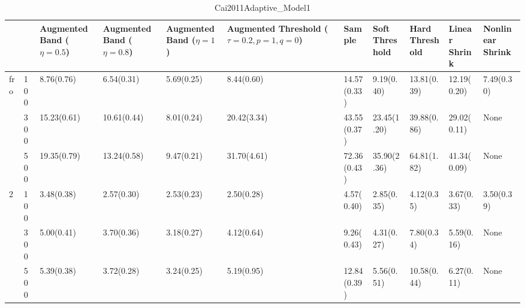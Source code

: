 \begin{table}[htbp]
\centering
\caption{Cai2011Adaptive_Model1}
\label{my label}
\begin{tabular}{ll|p{2cm}p{2cm}p{2cm}p{2cm}p{2cm}p{2cm}p{2cm}p{2cm}p{2cm}}
\toprule
  &     & Augmented Band ($\eta=0.5$) & Augmented Band ($\eta=0.8$) & Augmented Band ($\eta=1$) & Augmented Threshold ($\tau=0.2, p=1, q=0$) &       Sample & Soft Threshold & Hard Threshold & Linear Shrink & Nonlinear Shrink \\
\midrule
fro & 100 &                  8.76(0.76) &                  6.54(0.31) &                5.69(0.25) &                                 8.44(0.60) &  14.57(0.33) &     9.19(0.40) &    13.81(0.39) &   12.19(0.20) &       7.49(0.30) \\
  & 300 &                 15.23(0.61) &                 10.61(0.44) &                8.01(0.24) &                                20.42(3.34) &  43.55(0.37) &    23.45(1.20) &    39.88(0.86) &   29.02(0.11) &             None \\
  & 500 &                 19.35(0.79) &                 13.24(0.58) &                9.47(0.21) &                                31.70(4.61) &  72.36(0.43) &    35.90(2.36) &    64.81(1.82) &   41.34(0.09) &             None \\
2 & 100 &                  3.48(0.38) &                  2.57(0.30) &                2.53(0.23) &                                 2.50(0.28) &   4.57(0.40) &     2.85(0.35) &     4.12(0.35) &    3.67(0.33) &       3.50(0.39) \\
  & 300 &                  5.00(0.41) &                  3.70(0.36) &                3.18(0.27) &                                 4.12(0.64) &   9.26(0.43) &     4.31(0.27) &     7.80(0.34) &    5.59(0.16) &             None \\
  & 500 &                  5.39(0.38) &                  3.72(0.28) &                3.24(0.25) &                                 5.19(0.95) &  12.84(0.39) &     5.56(0.51) &    10.58(0.44) &    6.27(0.11) &             None \\
\bottomrule
\end{tabular}
\end{table}
